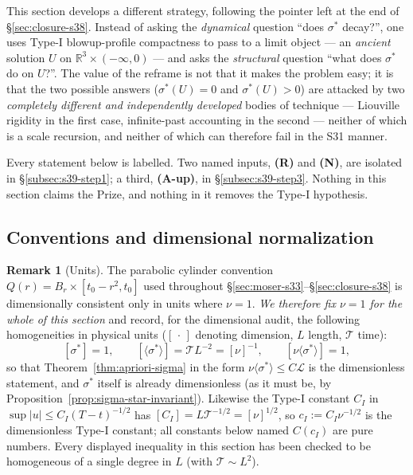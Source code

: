 \documentclass[11pt]{article}
\theoremstyle{definition}
\newtheorem{remark}[theorem]{Remark}
\theoremstyle{remark}
\newcommand{\R}{\mathbb{R}}
\begin{document}
This section develops a different strategy, following the pointer left at the
end of \S\ref{sec:closure-s38}. Instead of asking the \emph{dynamical} question
``does $\sigma^*$ decay?'', one uses Type-I blowup-profile compactness to pass
to a limit object --- an \emph{ancient} solution $U$ on $\R^3\times(-\infty,0)$
--- and asks the \emph{structural} question ``what does $\sigma^*$ do on
$U$?''. The value of the reframe is not that it makes the problem easy; it is
that the two possible answers ($\sigma^*(U)=0$ and $\sigma^*(U)>0$) are attacked
by two \emph{completely different and independently developed} bodies of
technique --- Liouville rigidity in the first case, infinite-past accounting in
the second --- neither of which is a scale recursion, and neither of which can
therefore fail in the S31 manner.

Every statement below is labelled. Two named inputs, \textbf{(R)} and
\textbf{(N)}, are isolated in \S\ref{subsec:s39-step1}; a third, \textbf{(A-up)},
in \S\ref{subsec:s39-step3}. Nothing in this section claims the Prize, and
nothing in it removes the Type-I hypothesis.

\subsection{Conventions and dimensional normalization}
\label{subsec:s39-conventions}

\begin{remark}[Units]\label{rem:s39-units}
The parabolic cylinder convention $Q(r) = B_r\times[t_0-r^2,t_0]$ used
throughout \S\ref{sec:moser-s33}--\S\ref{sec:closure-s38} is dimensionally
consistent only in units where $\nu=1$. \emph{We therefore fix $\nu=1$ for the
whole of this section} and record, for the dimensional audit, the following
homogeneities in physical units ($[\,\cdot\,]$ denoting dimension, $L$ length,
$\mathcal{T}$ time):
\[
  [\sigma^*] = 1,\qquad
  [\langle\sigma^*\rangle] = \mathcal{T}L^{-2} = [\nu]^{-1},\qquad
  [\nu\langle\sigma^*\rangle] = 1 ,
\]
so that Theorem~\ref{thm:apriori-sigma} in the form
$\nu\langle\sigma^*\rangle \leq C\mathcal{L}$ is the dimensionless statement,
and $\sigma^*$ itself is already dimensionless (as it must be, by
Proposition~\ref{prop:sigma-star-invariant}). Likewise the Type-I constant
$C_I$ in $\sup|u|\leq C_I(T-t)^{-1/2}$ has $[C_I] = L\mathcal{T}^{-1/2} =
[\nu]^{1/2}$, so $c_I := C_I\nu^{-1/2}$ is the dimensionless Type-I constant;
all constants below named $C(c_I)$ are pure numbers. Every displayed
inequality in this section has been checked to be homogeneous of a single
degree in $L$ (with $\mathcal{T}\sim L^2$).
\end{remark}
\end{document}
